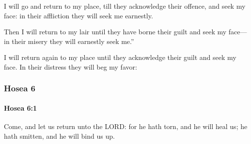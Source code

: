 			\begin{versebox}
					\item[BHS] 
					\item[LXX] 
					\item[ASV] I will go and return to my place, till they acknowledge their offence, and seek my face: in their affliction they will seek me earnestly.
					\item[NIV] Then I will return to my lair until they have borne their guilt and seek my face— in their misery they will earnestly seek me.”
					\item[NRSV] I will return again to my place until they acknowledge their guilt and seek my face. In their distress they will beg my favor:
			\end{versebox}
	\subsubsection{Hosea 6} %
		\label{HOSEA-6}

		\paragraph{Hosea 6:1} %
			\label{HOSEA-6-1}

			Come, and let us return unto the LORD: for he hath torn, and he will heal us; he hath smitten, and he will bind us up.

